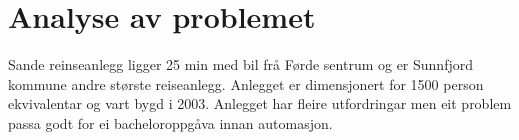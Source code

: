 \chapter{Analyse av problemet}
\thispagestyle{fancy}
Sande reinseanlegg ligger 25 min med bil frå Førde sentrum og er Sunnfjord kommune 
andre største reiseanlegg. Anlegget er dimensjonert for 1500 person ekvivalentar
og vart bygd i 2003. Anlegget har fleire utfordringar men eit problem passa godt for ei
bacheloroppgåva innan automasjon.